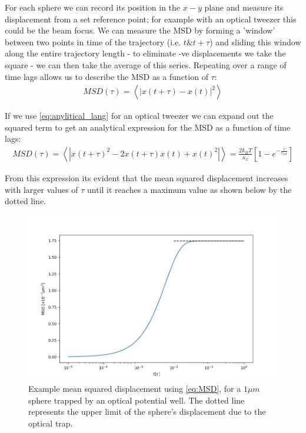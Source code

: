 For each sphere we can record its position in the $x-y$ plane and 
measure its displacement from a set reference point; for example 
with an optical tweezer this could be the beam focus. We can measure 
the MSD by forming a 'window' between two points in time of the 
trajectory (i.e. $t \&  t+\tau$) and sliding this window along the 
entire trajectory length - to eliminate -ve displacements we take 
the square - we can then take the average of this series. Repeating 
over a range of time lags allows us to describe the MSD as a function 
of $\tau$:
\begin{align}
	MSD(\tau) = \left<|x(t+\tau) - x(t)|^2\right>
\end{align}

If we use \eqref{eq:anylitical_lang} for an optical tweezer we can 
expand out the squared term to get an analytical expression for the 
MSD as a function of time lags:
\begin{align}
	\label{eq:MSD}
	MSD(\tau) = \left<|x(t+\tau)^2-2x(t+\tau)x(t)+x(t)^2|\right> = \frac{2k_BT}{\kappa_x}\left[1-e^{-\frac{\tau}{\tau_{OT}}}\right]
\end{align}

From this expression its evident that the mean squared displacement 
increases with larger values of $\tau$ until it reaches a maximum 
value as shown below by the dotted line.
\begin{figure}[h!]
	\centering
	\includegraphics[width=\linewidth]{MSD.png}
	\caption{Example mean squared displacement using \eqref{eq:MSD}, 
		for a $1\mu m$ sphere trapped by an optical potential well. 
		The dotted line represents the upper limit of the sphere's 
		displacement due to the optical trap.}
\end{figure}

